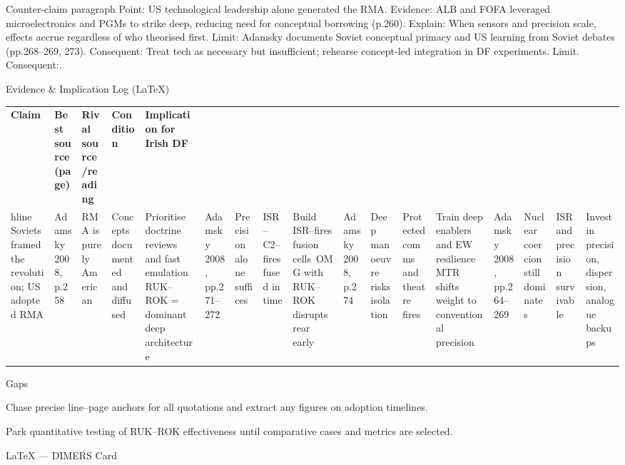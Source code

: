 Counter-claim paragraph
Point: US technological leadership alone generated the RMA.
Evidence: ALB and FOFA leveraged microelectronics and PGMs to strike deep, reducing need for conceptual borrowing (p.260).
Explain: When sensors and precision scale, effects accrue regardless of who theorised first.
Limit: Adamsky documents Soviet conceptual primacy and US learning from Soviet debates (pp.268–269, 273).
Consequent: Treat tech as necessary but insufficient; rehearse concept-led integration in DF experiments. Limit. Consequent:.

Evidence & Implication Log (LaTeX)

\usepackage{array}
\begin{tabular}{p{3.2cm}p{4.2cm}p{3.6cm}p{3.2cm}p{4.2cm}}
	\textbf{Claim} & \textbf{Best source (page)} & \textbf{Rival source/reading} & \textbf{Condition} & \textbf{Implication for Irish DF}\\hline
	Soviets framed the revolution; US adopted RMA & Adamsky 2008, p.258 & RMA is purely American & Concepts documented and diffused & Prioritise doctrine reviews and fast emulation\
	RUK–ROK = dominant deep architecture & Adamsky 2008, pp.271–272 & Precision alone suffices & ISR–C2–fires fused in time & Build ISR–fires fusion cells\
	OMG with RUK–ROK disrupts rear early & Adamsky 2008, p.274 & Deep manoeuvre risks isolation & Protected comms and theatre fires & Train deep enablers and EW resilience\
	MTR shifts weight to conventional precision & Adamsky 2008, pp.264–269 & Nuclear coercion still dominates & ISR and precision survivable & Invest in precision, dispersion, analogue backups\
\end{tabular}

Gaps

Chase precise line–page anchors for all quotations and extract any figures on adoption timelines.

Park quantitative testing of RUK–ROK effectiveness until comparative cases and metrics are selected.

\parencite{EKEN_2025}

LaTeX — DIMERS Card

